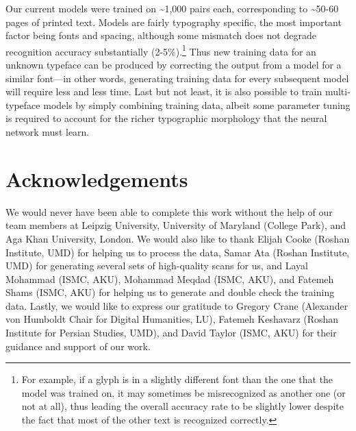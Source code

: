 Our current models were trained on \textasciitilde1,000 pairs each, corresponding to
\textasciitilde50-60 pages of printed text. Models are fairly typography specific,
the most important factor being fonts and spacing, although some mismatch does
not degrade recognition accuracy substantially (2-5\%).\footnote{For example,
if a glyph is in a slightly different font than the one that the model was
trained on, it may sometimes be misrecognized as another one (or not at all),
thus leading the overall accuracy rate to be slightly lower despite the fact
that most of the other text is recognized correctly.} Thus new training data
for an unknown typeface can be produced by correcting the output from a model
for a similar font—in other words, generating training data for every
subsequent model will require less and less time. Last but not least, it is
also possible to train multi-typeface models by simply combining training data,
albeit some parameter tuning is required to account for the richer typographic
morphology that the neural network must learn.

\section{Acknowledgements}

We would never have been able to complete this work without the help of our
team members at Leipzig University, University of Maryland (College Park), and
Aga Khan University, London. We would also like to thank Elijah Cooke (Roshan
Institute, UMD) for helping us to process the data, Samar Ata (Roshan
Institute, UMD) for generating several sets of high-quality scans for us, and
Layal Mohammad (ISMC, AKU), Mohammad Meqdad (ISMC, AKU), and Fatemeh Shams
(ISMC, AKU) for helping us to generate and double check the training data.
Lastly, we would like to express our gratitude to Gregory Crane (Alexander von
Humboldt Chair for Digital Humanities, LU), Fatemeh Keshavarz (Roshan Institute
for Persian Studies, UMD), and David Taylor (ISMC, AKU) for their guidance and
support of our work. 

